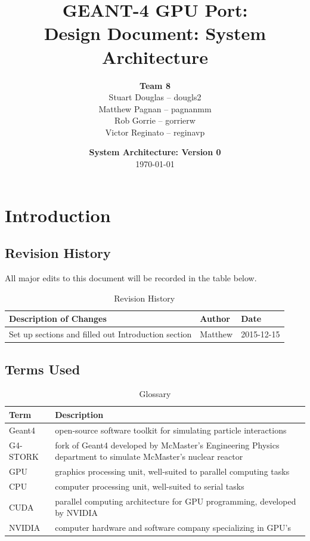 \documentclass[12pt]{article}
\title{
\LARGE GEANT-4 GPU Port:
\\\vspace{10mm}
\large \textbf{Design Document: System Architecture}
\vspace{40mm}
}
\author{
\textbf{Team 8}
\\Stuart Douglas -- dougls2
\\Matthew Pagnan -- pagnanmm
\\Rob Gorrie -- gorrierw
\\Victor Reginato -- reginavp
\vspace{10mm}
}
\date{\vfill \textbf{System Architecture: Version 0}\\ \today}
\begin{document}

\maketitle
\newpage

\renewcommand{\contentsname}{Table of Contents}
\tableofcontents
\newpage
{}

\section{Introduction}%
\subsection{Revision History}
All major edits to this document will be recorded in the table below.

\begin{table}[h]
\centering
\caption{Revision History}\label{Table_Revision}
\begin{tabularx}{\textwidth}{Xll}
\toprule
\bf Description of Changes & \bf Author & \bf Date\\\midrule
Set up sections and filled out Introduction section & Matthew & 2015-12-15\\
\bottomrule
\end{tabularx}
\end{table}

\subsection{Terms Used}
\begin{table}[h]
\centering
\caption{Glossary}\label{Table_Glossary}
\begin{tabularx}{\textwidth}{lX}
\toprule
\bf Term & \bf Description\\\midrule\vspace{1mm}
Geant4 & open-source software toolkit for simulating particle interactions\\\vspace{1mm}
G4-STORK & fork of Geant4 developed by McMaster's Engineering Physics department to simulate McMaster's nuclear reactor\\\vspace{1mm}
GPU & graphics processing unit, well-suited to parallel computing tasks\\\vspace{1mm}
CPU & computer processing unit, well-suited to serial tasks\\\vspace{1mm}
CUDA & parallel computing architecture for GPU programming, developed by NVIDIA\\\vspace{1mm}
NVIDIA & computer hardware and software company specializing in GPU's\\
\bottomrule
\end{tabularx}
\end{table}
\end{document}
